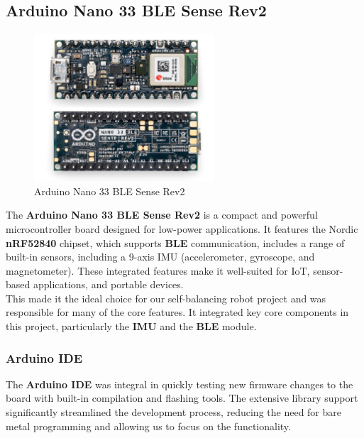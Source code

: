 \documentclass{article}
\begin{document}
\subsection{Arduino Nano 33 BLE Sense Rev2}

\begin{figure}[H]
    \centering
    \includegraphics[width=0.6\textwidth]{Figures/arduino.jpg} %
    \caption{Arduino Nano 33 BLE Sense Rev2}
    \label{fig:arduino}
\end{figure}

\begin{minipage}{\linewidth}
    The \textbf{Arduino Nano 33 BLE Sense Rev2}  is a compact and powerful microcontroller board
    designed for low-power applications. It features the Nordic \textbf{nRF52840} chipset,
    which supports \textbf{BLE} communication, includes a range of built-in sensors,
    including a 9-axis IMU (accelerometer, gyroscope, and magnetometer).
    These integrated features make it well-suited for IoT, sensor-based applications, and portable devices. \\

    This made it the ideal choice for our self-balancing robot project and was responsible for many of the core features.
    It integrated key core components in this project, particularly the \textbf{IMU} and the \textbf{BLE} module. \\
\end{minipage}


\subsubsection{Arduino IDE}

\begin{minipage}{\linewidth}
    The \textbf{Arduino IDE} was integral in quickly testing new firmware changes to the board with built-in compilation and flashing tools.
    The extensive library support significantly streamlined the development process, reducing the need for bare metal programming and allowing us to focus on the functionality.
\end{minipage}
\end{document}
